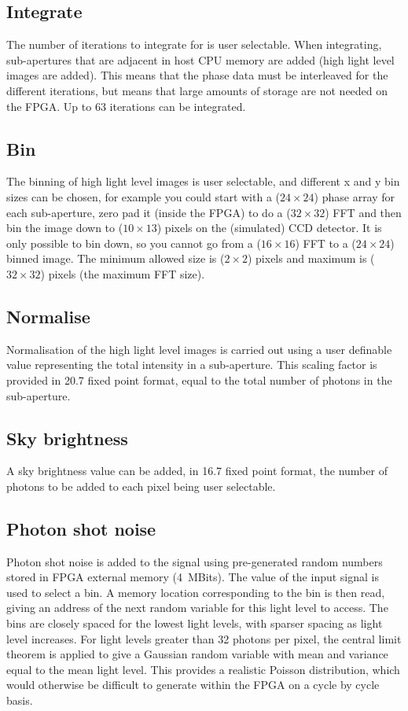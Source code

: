 \documentclass{article}
\begin{document}
\subsection{Integrate}
The number of iterations to integrate for is user selectable.  When
integrating, sub-apertures that are adjacent in host CPU memory are
added (high light level images are added).  This means that the phase
data must be interleaved for the different iterations, but means that
large amounts of storage are not needed on the FPGA.  Up to 63
iterations can be integrated.

\subsection{Bin}
The binning of high light level images is user selectable, and
different x and y bin sizes can be chosen, for example you could start
with a ($24\times24$) phase array for each sub-aperture, zero pad it
(inside the FPGA) to do a ($32\times32$) FFT and then bin the image
down to ($10\times13$) pixels on the (simulated) CCD detector.
It is only possible to bin down, so you cannot go from a
($16\times16$) FFT to a ($24\times24$) binned image.  The minimum
allowed size is ($2\times2$) pixels and maximum is ($32\times32$)
pixels (the maximum FFT size).

\subsection{Normalise}
Normalisation of the high light level images is carried out using a
user definable value representing the total intensity in a
sub-aperture.  This scaling factor is provided in 20.7 fixed point
format, equal to the total number of photons in the sub-aperture.

\subsection{Sky brightness}
A sky brightness value can be added, in 16.7 fixed point format, the
number of photons to be added to each pixel being user selectable.

\subsection{Photon shot noise}
Photon shot noise is added to the signal using pre-generated random
numbers stored in FPGA external memory (4~MBits).  The value of the
input signal is used to select a bin.  A memory location corresponding
to the bin is then read, giving an address of the next random variable
for this light level to access.  The bins are closely spaced for the
lowest light levels, with sparser spacing as light level increases.
For light levels greater than 32 photons per pixel, the central limit
theorem is applied to give a Gaussian random variable with mean and
variance equal to the mean light level.  This provides a realistic
Poisson distribution, which would otherwise be difficult to generate
within the FPGA on a cycle by cycle basis.
\end{document}
